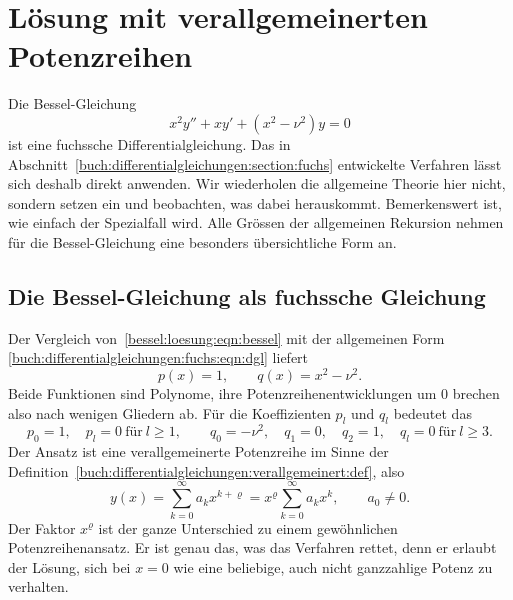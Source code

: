%
%
%
\section{Lösung mit verallgemeinerten Potenzreihen
\label{bessel:section:loesung}}
%
%
Die Bessel-Gleichung
\begin{equation}
x^2y'' + xy' + (x^2-\nu^2)y = 0
\label{bessel:loesung:eqn:bessel}
\end{equation}
ist eine fuchssche Differentialgleichung.
Das in Abschnitt~\ref{buch:differentialgleichungen:section:fuchs} entwickelte Verfahren lässt sich deshalb direkt anwenden.
Wir wiederholen die allgemeine Theorie hier nicht, sondern setzen ein und beobachten, was dabei herauskommt.
Bemerkenswert ist, wie einfach der Spezialfall wird.
Alle Grössen der allgemeinen Rekursion nehmen für die Bessel-Gleichung eine besonders übersichtliche Form an.
 
%
%
\subsection{Die Bessel-Gleichung als fuchssche Gleichung
\label{bessel:loesung:subsection:fuchssch}}
Der Vergleich von~\eqref{bessel:loesung:eqn:bessel} mit der allgemeinen Form \eqref{buch:differentialgleichungen:fuchs:eqn:dgl} liefert
\begin{equation}
p(x) = 1,
\qquad
q(x) = x^2-\nu^2.
\label{bessel:loesung:eqn:pq}
\end{equation}
Beide Funktionen sind Polynome, ihre Potenzreihenentwicklungen um $0$ brechen also nach wenigen Gliedern ab.
Für die Koeffizienten $p_l$ und $q_l$ bedeutet das
\begin{equation}
p_0 = 1,
\quad
p_l = 0
\ \text{für}\ l \ge 1,
\qquad
q_0 = -\nu^2,
\quad
q_1 = 0,
\quad
q_2 = 1,
\quad
q_l = 0
\ \text{für}\ l\ge 3.
\label{bessel:loesung:eqn:koeffizienten}
\end{equation}
Der Ansatz ist eine verallgemeinerte Potenzreihe im Sinne der Definition~\ref{buch:differentialgleichungen:verallgemeinert:def}, also
\begin{equation}
y(x)
=
\sum_{k=0}^\infty
a_k x^{k+\varrho}
=
x^\varrho
\sum_{k=0}^\infty
a_k x^k,
\qquad
a_0 \ne 0.
\label{bessel:loesung:eqn:ansatz}
\end{equation}
Der Faktor $x^\varrho$ ist der ganze Unterschied zu einem gewöhnlichen Potenzreihenansatz.
Er ist genau das, was das Verfahren rettet, denn er erlaubt der Lösung, sich bei $x=0$ wie eine beliebige, auch nicht ganzzahlige Potenz zu verhalten.
 
